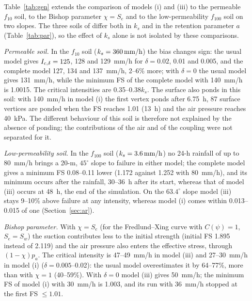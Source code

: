 Table~\ref{tab:gen} extends the comparison of models (i) and (iii) to the permeable $f_{10}$ soil, to the Bishop
parameter $\chi=S_e$ and to the low-permeability $f_{100}$ soil on two slopes. The three soils of
\citet{rahardjo2007} differ both in $k_s$ and in the retention parameter $a$ (Table~\ref{tab:par}), so the effect of
$k_s$ alone is not isolated by these comparisons.

\begin{table}[htbp]
\centering\footnotesize\setlength{\tabcolsep}{3.5pt}
\caption{Critical intensity $\Icd$ (mm/h) of 24-h rainfalls in the usual model (iii) and in the complete model (i,
$\psi=\phi'$), and the lowest minimum FS computed. $>$: no failure up to the most intense rainfall computed;
$\le$: upper bound (the run at the upper intensity stopped at the first FS $\le1.01$, so its minimum FS is not
known); n.c.: not computable with the runs available.}\label{tab:gen}

\end{table}

\emph{Permeable soil.} In the $f_{10}$ soil ($k_s=360\,\mathrm{mm/h}$) the bias changes sign: the usual model gives
$I_{c,\delta}=125$, 128 and 129~mm/h for $\delta=0.02$, 0.01 and 0.005, and the complete model 127, 134 and 137~mm/h, 2--6\%
more; with $\delta=0$ the usual model gives 131~mm/h, while the minimum FS of the complete model with 140~mm/h is
1.0015. The critical intensities are 0.35--0.38$k_s$. The surface also ponds in this soil: with 140~mm/h in model (i)
the first vertex ponds after 6.75~h, 87 surface vertices are ponded when the FS reaches 1.01 (13~h) and the air
pressure reaches 40~kPa. The different behaviour of this soil is therefore not explained by the absence of ponding;
the contributions of the air and of the coupling were not separated for it.

\emph{Low-permeability soil.} In the $f_{100}$ soil ($k_s=3.6\,\mathrm{mm/h}$) no 24-h rainfall of up to 80~mm/h brings a
20-m, $45^\circ$ slope to failure in either model; the complete model gives a minimum FS 0.08--0.11 lower (1.172
against 1.252 with 80~mm/h), and its minimum occurs after the rainfall, 30--36~h after its start, whereas that of
model (iii) occurs at 48~h, the end of the simulation. On the $63.4^\circ$ slope model (iii) stays 9--10\% above
failure at any intensity, whereas model (i) comes within 0.013--0.015 of one (Section~\ref{sec:ar}).

\emph{Bishop parameter.} With $\chi=S_e$ (for the Fredlund--Xing curve with $C(\psi)=1$, $S_e=S_w$) the suction
contributes less to the initial strength (initial FS 1.895 instead of 2.119) and the air pressure also enters the
effective stress, through $(1-\chi)p_a$. The critical intensity is 47--49~mm/h in model (iii) and 27--30~mm/h in
model (i) ($\delta=0.005$--0.02): the usual model overestimates it by 64--77\%, more than with $\chi=1$ (40--59\%).
With $\delta=0$ model (iii) gives 50~mm/h; the minimum FS of model (i) with 30~mm/h is 1.003, and its run with
36~mm/h stopped at the first FS $\le1.01$.

